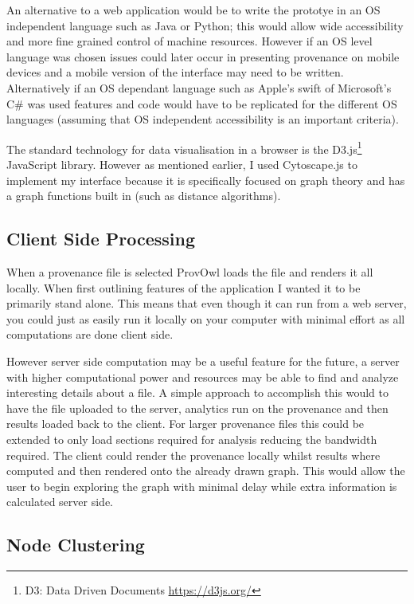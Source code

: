 An alternative to a web application would be to write the prototye in an OS independent language such as Java or Python; this would allow wide accessibility and more fine grained control of machine resources. However if an OS level language was chosen issues could later occur in presenting provenance on mobile devices and a mobile version of the interface may need to be written. Alternatively if an OS dependant language such as Apple's swift of Microsoft's C\# was used features and code would have to be replicated for the different OS languages (assuming that OS independent accessibility is an important criteria).

The standard technology for data visualisation in a browser is the D3.js\footnote{D3: Data Driven Documents \url{https://d3js.org/}} JavaScript library. However as mentioned earlier, I used Cytoscape.js to implement my interface because it is specifically focused on graph theory and has a graph functions built in (such as distance algorithms). 

\subsection{Client Side Processing}
\label{sec:client_side_processing}

When a provenance file is selected ProvOwl loads the file and renders it all locally. When first outlining features of the application I wanted it to be primarily stand alone. This means that even though it can run from a web server, you could just as easily run it locally on your computer with minimal effort as all computations are done client side.

However server side computation may be a useful feature for the future, a server with higher computational power and resources may be able to find and analyze interesting details about a file. A simple approach to accomplish this would to have the file uploaded to the server, analytics run on the provenance and then results loaded back to the client. For larger provenance files this could be extended to only load sections required for analysis reducing the bandwidth required. The client could render the provenance locally whilst results where computed and then rendered onto the already drawn graph. This would allow the user to begin exploring the graph with minimal delay while extra information is calculated server side.

\subsection{Node Clustering}

